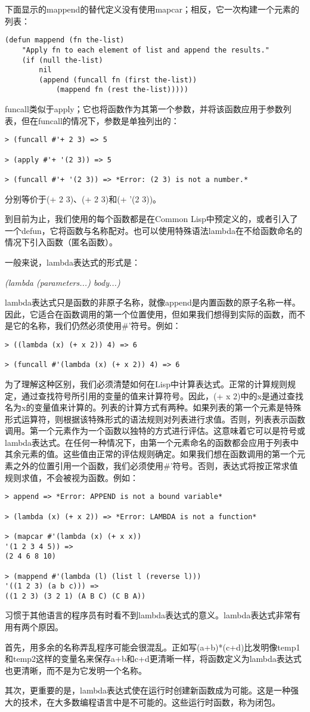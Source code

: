 下面显示的mappend的替代定义没有使用mapcar；相反，它一次构建一个元素的列表：
\begin{lstlisting}[frame=shadowbox]
(defun mappend (fn the-list)
	"Apply fn to each element of list and append the results."
	(if (null the-list)
		nil
		(append (funcall fn (first the-list))
			(mappend fn (rest the-list)))))
\end{lstlisting}

funcall类似于apply；它也将函数作为其第一个参数，并将该函数应用于参数列表，但在funcall的情况下，参数是单独列出的：
\begin{lstlisting}[frame=shadowbox]
> (funcall #'+ 2 3) => 5

> (apply #'+ '(2 3)) => 5

> (funcall #'+ '(2 3)) => *Error: (2 3) is not a number.*
\end{lstlisting}
分别等价于(+ 2 3)、(+ 2 3)和(+ '(2 3))。

到目前为止，我们使用的每个函数都是在Common Lisp中预定义的，或者引入了一个defun，它将函数与名称配对。也可以使用特殊语法lambda在不给函数命名的情况下引入函数（匿名函数）。

一般来说，lambda表达式的形式是：

\emph{(lambda (parameters...) body...)}

lambda表达式只是函数的非原子名称，就像append是内置函数的原子名称一样。因此，它适合在函数调用的第一个位置使用，但如果我们想得到实际的函数，而不是它的名称，我们仍然必须使用\#'符号。例如：
\begin{lstlisting}[frame=shadowbox]
> ((lambda (x) (+ x 2)) 4) => 6

> (funcall #'(lambda (x) (+ x 2)) 4) => 6
\end{lstlisting}	

为了理解这种区别，我们必须清楚如何在Lisp中计算表达式。正常的计算规则规定，通过查找符号所引用的变量的值来计算符号。因此，(+ x 2)中的x是通过查找名为x的变量值来计算的。列表的计算方式有两种。如果列表的第一个元素是特殊形式运算符，则根据该特殊形式的语法规则对列表进行求值。否则，列表表示函数调用。第一个元素作为一个函数以独特的方式进行评估。这意味着它可以是符号或lambda表达式。在任何一种情况下，由第一个元素命名的函数都会应用于列表中其余元素的值。这些值由正常的评估规则确定。如果我们想在函数调用的第一个元素之外的位置引用一个函数，我们必须使用\#'符号。否则，表达式将按正常求值规则求值，不会被视为函数。例如：
\begin{lstlisting}[frame=shadowbox]
> append => *Error: APPEND is not a bound variable*

> (lambda (x) (+ x 2)) => *Error: LAMBDA is not a function*

> (mapcar #'(lambda (x) (+ x x))
'(1 2 3 4 5)) =>
(2 4 6 8 10)

> (mappend #'(lambda (l) (list l (reverse l)))
'((1 2 3) (a b c))) =>
((1 2 3) (3 2 1) (A B C) (C B A))
\end{lstlisting}

习惯于其他语言的程序员有时看不到lambda表达式的意义。lambda表达式非常有用有两个原因。

首先，用多余的名称弄乱程序可能会很混乱。正如写(a+b)*(c+d)比发明像temp1和temp2这样的变量名来保存a+b和c+d更清晰一样，将函数定义为lambda表达式也更清晰，而不是为它发明一个名称。

其次，更重要的是，lambda表达式使在运行时创建新函数成为可能。这是一种强大的技术，在大多数编程语言中是不可能的。这些运行时函数，称为闭包。